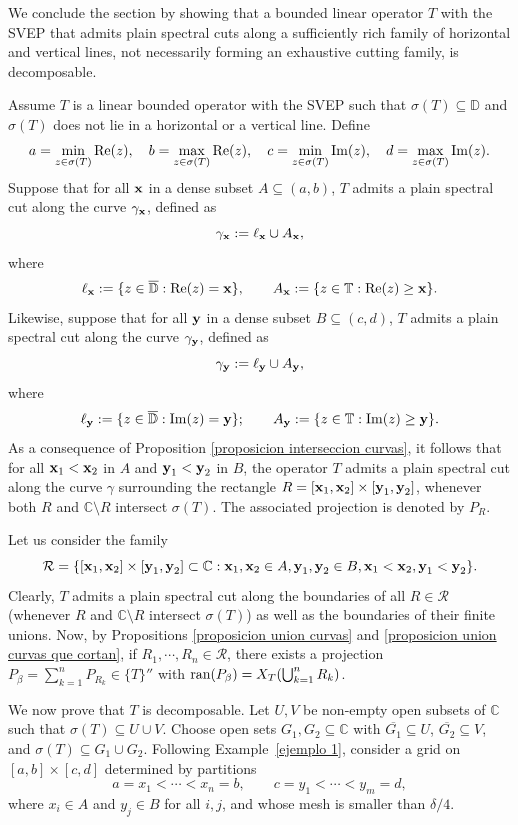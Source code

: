 \documentclass[11pt]{amsart}
\theoremstyle{definition}
\theoremstyle{remark}
\numberwithin{equation}{section}
\DeclareMathOperator*{\Impart}{Im}
\newcommand{\ran}{\textnormal{ran}}
\newcommand{\C}{\mathbb{C}}
\newcommand{\D}{\mathbb{D}}
\newcommand{\T}{\mathbb{T}}
\newcommand{\PR}{\textnormal{Re}}
\newcommand{\y}{\textnormal{\textbf{y}}}
\newcommand{\x}{\textnormal{\textbf{x}} }
\newcommand{\biconm}[1]{{\{#1\}''}}
\begin{document}
\medskip

We conclude the section by showing that a bounded linear operator $T$ with the SVEP that admits plain spectral cuts along a sufficiently rich family of horizontal and vertical lines, not necessarily forming an exhaustive cutting family, is decomposable.

\medskip

Assume $T$ is a linear bounded operator with the SVEP such that $\sigma(T)\subseteq  \D$ and $\sigma(T)$ does not lie in a horizontal or a vertical line. Define
    $$
    a=\min_{z\in \sigma(T)}\PR(z), \quad b=\max_{z\in \sigma(T)}\PR(z), \quad c=\min_{z\in \sigma(T)}\Impart(z), \quad d=\max_{z\in \sigma(T)}\Impart(z).
    $$
Suppose that for all $\x$ in a dense subset $A\subseteq  (a,b)$,  $T$ admits a plain spectral cut along the curve $\gamma_\x$, defined as
    $$     \gamma_\x :=\ell_\x \cup A_\x,     $$ where $$\ell_\x := \{z\in\overline{\D}: \PR(z)=\x\}, \qquad A_\x := \{z\in \T: \PR(z)\geq \x\}.$$
Likewise, suppose  that for all $\y$ in a dense subset $B\subseteq  (c,d)$, $T$ admits a plain spectral cut along the curve $\gamma_\y$, defined as
    $$     \gamma_\y :=\ell_\y \cup A_\y,     $$ where $$\ell_\y := \{z\in\overline{\D}: \Impart(z)=\y\}; \qquad A_\y := \{z\in \T: \Impart(z)\geq \y\}.$$
As a consequence of Proposition \ref{proposicion interseccion curvas}, it follows that for all $\x_1<\x_2$ in $A$ and $\y_1<\y_2$ in $B$, the operator $T$ admits a plain spectral cut along the curve $\gamma$ surrounding the rectangle $R=[\x_1,\x_2]\times [\y_1,\y_2]$, whenever both $R$ and $\mathbb{C}\setminus R$ intersect $\sigma(T)$. The associated projection is denoted by $P_R$.

\smallskip

Let us consider the family
    $$
    \mathcal{R} = \{[\x_1,\x_2]\times[\y_1,\y_2]\subset \C: \x_1,\x_2 \in A, \y_1,\y_2 \in B, \x_1<\x_2, \y_1<\y_2  \}.
    $$
Clearly, $T$ admits a plain spectral cut along the boundaries of all $R\in \mathcal{R}$ (whenever $R$ and $\C\setminus R$ intersect $\sigma(T)$) as well as the boundaries of their finite unions. Now, by Propositions \ref{proposicion union curvas} and \ref{proposicion union curvas que cortan}, if $R_1,\cdots,R_n \in \mathcal{R}$, there exists a projection $P_\beta = \sum_{k=1}^n P_{R_k}\in \biconm{T}$ with $\ran(P_\beta)=X_T(\bigcup_{k=1}^n R_k)$.

\smallskip

We now prove that $T$ is decomposable. Let $U,V$ be non-empty open subsets of $\mathbb{C}$ such that $\sigma(T)\subseteq U\cup V$. Choose open sets $G_1,G_2\subseteq \mathbb{C}$ with $\overline{G_1}\subseteq U$, $\overline{G_2}\subseteq V$, and $\sigma(T)\subseteq G_1\cup G_2$. Following Example~\ref{ejemplo 1}, consider a grid on $[a,b]\times[c,d]$ determined by partitions
$$
a=x_1<\cdots<x_n=b, \qquad c=y_1<\cdots<y_m=d,
$$
where $x_i\in A$ and $y_j\in B$ for all $i,j$, and whose mesh is smaller than $\delta/4$.
\end{document}
